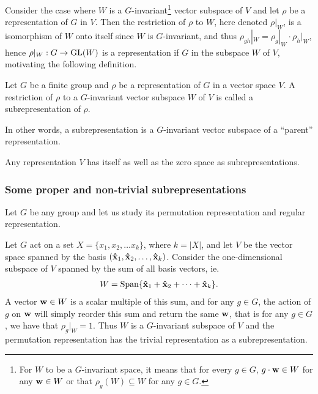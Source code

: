 Consider the case where $W$ is a $G$-invariant\footnote{For $W$ to be a $G$-invariant space, it means that for every $g \in G$, $g \cdot \mathbf{w} \in W$ for any $\mathbf{w} \in W$ or that $\rho_g(W) \subseteq W$ for any $g\in G$.} vector subspace of $V$%
and let $\rho$ be a representation of $G$ in $V$. Then the restriction of $\rho$ to $W$, here denoted $\rho|_W$, is a isomorphism of $W$ onto itself since $W$ is $G$-invariant,
and thus $\rho_{gh}|_W = \rho_g|_W \cdot \rho_h|_W$, hence $\rho|_W: G \rightarrow \text{GL}(W)$ is a representation if $G$ in the subspace $W$ of $V$, motivating the following definition.

\begin{definition}[Subrepresentation]\label{def:subrepr}
	Let $G$ be a finite group and $\rho$ be a representation of $G$ in a vector space $V$. A restriction of $\rho$ to a $G$-invariant vector subspace $W$ of $V$ is called a subrepresentation of $\rho$.
\end{definition}

In other words, a subrepresentation is a $G$-invariant vector subspace of a ``parent'' representation. 

\begin{example}
	Any representation $V$ has itself as well as the zero space as subrepresentations.
\end{example}

\subsubsection{Some proper and non-trivial subrepresentations}

Let $G$ be any group and let us study its permutation representation and regular representation. 

\begin{example}\cite[Example 1.4.3.]{Sagan}\label{example:trivpermrepr}
	Let $G$ act on a set $X = \{x_1, x_2, \dots x_k\}$, where $k = |X|$, and let $V$ be the vector space spanned by the basis $(\mathbf{\hat{x}}_1, \mathbf{\hat{x}}_2, \dots, \mathbf{\hat{x}}_k)$. Consider the one-dimensional subspace of $V$ spanned by the sum of all basis vectors, ie. 
	\begin{align*}	
		W = \text{Span}\{ \mathbf{\hat{x}}_1 + \mathbf{\hat{x}}_2 + \dots + \mathbf{\hat{x}}_k \}.
	\end{align*}A vector $\mathbf{w} \in W$ is a scalar multiple of this sum, and for any $g \in G$, the action of $g$ on $\mathbf{w}$ will simply reorder this sum and return the same $\mathbf{w}$, that is for any $g \in G$, we have that $\rho_g|_W = 1$. Thus $W$ is a $G$-invariant subspace of $V$ and the permutation representation has the trivial representation as a subrepresentation.
\end{example}

